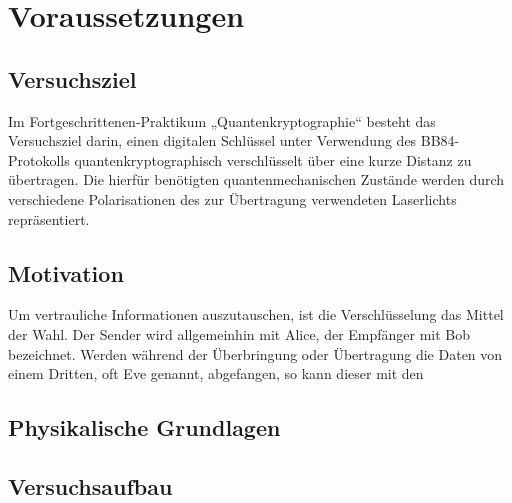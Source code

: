 \section{Voraussetzungen}

\subsection{Versuchsziel}

Im Fortgeschrittenen-Praktikum „Quantenkryptographie“ besteht das Versuchsziel
darin, einen digitalen Schlüssel unter Verwendung des BB84-Protokolls
quantenkryptographisch verschlüsselt über eine kurze Distanz zu übertragen.
Die hierfür benötigten quantenmechanischen Zustände werden durch verschiedene
Polarisationen des zur Übertragung verwendeten Laserlichts repräsentiert.

\subsection{Motivation}

Um vertrauliche Informationen auszutauschen, ist die Verschlüsselung das
Mittel der Wahl. Der Sender wird allgemeinhin mit Alice, der Empfänger mit Bob
bezeichnet. Werden während der Überbringung oder Übertragung die Daten von
einem Dritten, oft Eve genannt, abgefangen, so kann dieser mit den


\subsection{Physikalische Grundlagen}

\subsection{Versuchsaufbau}